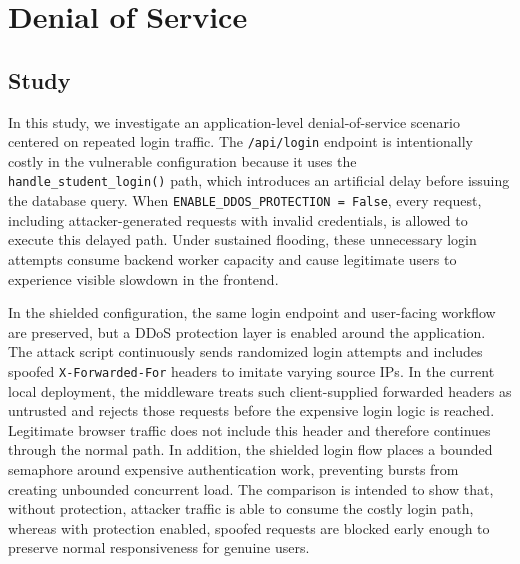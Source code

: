 \documentclass[11pt,a4paper]{article}
\begin{document}
\section{Denial of Service}

\subsection{Study}

In this study, we investigate an application-level denial-of-service scenario centered on repeated login traffic. The \texttt{/api/login} endpoint is intentionally costly in the vulnerable configuration because it uses the \texttt{handle\_student\_login()} path, which introduces an artificial delay before issuing the database query. When \texttt{ENABLE\_DDOS\_PROTECTION = False}, every request, including attacker-generated requests with invalid credentials, is allowed to execute this delayed path. Under sustained flooding, these unnecessary login attempts consume backend worker capacity and cause legitimate users to experience visible slowdown in the frontend.

In the shielded configuration, the same login endpoint and user-facing workflow are preserved, but a DDoS protection layer is enabled around the application. The attack script continuously sends randomized login attempts and includes spoofed \texttt{X-Forwarded-For} headers to imitate varying source IPs. In the current local deployment, the middleware treats such client-supplied forwarded headers as untrusted and rejects those requests before the expensive login logic is reached. Legitimate browser traffic does not include this header and therefore continues through the normal path. In addition, the shielded login flow places a bounded semaphore around expensive authentication work, preventing bursts from creating unbounded concurrent load. The comparison is intended to show that, without protection, attacker traffic is able to consume the costly login path, whereas with protection enabled, spoofed requests are blocked early enough to preserve normal responsiveness for genuine users.
\end{document}
